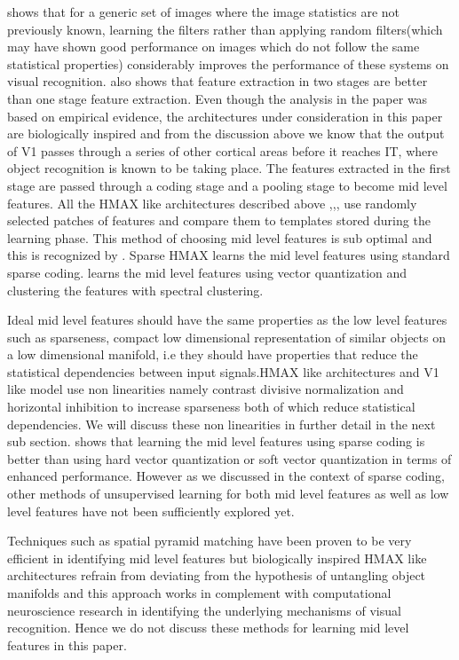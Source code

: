 \documentclass[12pt,twoside]{article}
\theoremstyle{plain}
\theoremstyle{definition}
\theoremstyle{remark}
\begin{document}
\cite{KevinJarret2009} shows that for a generic set of images where the image statistics are not previously known, learning the filters rather than applying random filters(which may have shown good performance on images which do not follow the same statistical properties) considerably improves the performance of these systems on visual recognition. \cite{KevinJarret2009} also shows that feature extraction in two stages are better than one stage feature extraction. Even though the analysis in the paper was based on empirical evidence, the architectures under consideration in this paper are biologically inspired and from the discussion above we know that the output of V1 passes through  a series of other cortical areas before it reaches IT, where object recognition is known to be taking place.
The features extracted in the first stage are passed through a coding stage and a pooling stage to become mid level features. All the HMAX like architectures described above \cite{Fukushim1980},\cite{JimMutch2008},\cite{MaximilianRiesenhuber1999},\cite{ThomasSerre2007} use randomly selected patches of features and compare them to templates stored during the learning phase. This method of choosing mid level features is sub optimal and this is recognized by \cite{XiaolinHu2014}. Sparse HMAX learns the mid level features using standard sparse coding. \cite{MarkusLessmann2014} learns the mid level features using vector quantization and clustering the features with spectral clustering. 

Ideal mid level features should have the same properties as the low level features such as sparseness, compact low dimensional representation of similar objects on a low dimensional manifold, i.e they should have properties that reduce the statistical dependencies between input signals.HMAX like architectures and V1 like model\cite{NicolasPinto2008} use non linearities namely contrast divisive normalization and horizontal inhibition to increase sparseness both of which reduce statistical dependencies. We will discuss these non linearities in further detail in the next sub section. \cite{Y-LanBoureau2010} shows that learning the mid level features using sparse coding is better than using hard vector quantization or soft vector quantization in terms of enhanced performance. However as we discussed in the context of sparse coding, other methods of unsupervised learning for both mid level features as well as low level features have not been sufficiently explored yet. 

Techniques such as spatial pyramid matching have been proven to be very efficient in identifying mid level features but biologically inspired HMAX like architectures refrain from deviating from the hypothesis of untangling object manifolds and this approach works in complement with computational neuroscience research in identifying the underlying mechanisms of visual recognition. Hence we do not discuss these methods for learning mid level features in this paper.
\end{document}
